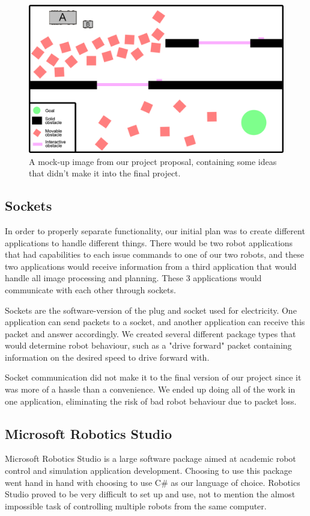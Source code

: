 \documentclass[10pt, abstracton, twocolumn]{scrartcl}
\begin{document}
\begin{appendices}
\begin{figure}
	\centering
	\includegraphics[width=\columnwidth]{pictures/proposalImage.png}
	\caption{\small A mock-up image from our project proposal, containing some ideas that didn't make it into the final project.}
	\label{fig:proposal}
\end{figure}

\subsection{Sockets}
In order to properly separate functionality, our initial plan was to create different applications to handle different things. There would be two robot applications that had capabilities to each issue commands to one of our two robots, and these two applications would receive information from a third application that would handle all image processing and planning. These 3 applications would communicate with each other through sockets.

Sockets are the software-version of the plug and socket used for electricity. One application can send packets to a socket, and another application can receive this packet and answer accordingly. We created several different package types that would determine robot behaviour, such as a "drive forward" packet containing information on the desired speed to drive forward with.

Socket communication did not make it to the final version of our project since it was more of a hassle than a convenience. We ended up doing all of the work in one application, eliminating the risk of bad robot behaviour due to packet loss.

\subsection{Microsoft Robotics Studio}
Microsoft Robotics Studio is a large software package aimed at academic robot control and simulation application development. Choosing to use this package went hand in hand with choosing to use C\# as our language of choice. Robotics Studio proved to be very difficult to set up and use, not to mention the almost impossible task of controlling multiple robots from the same computer.


\end{appendices}
\end{document}
